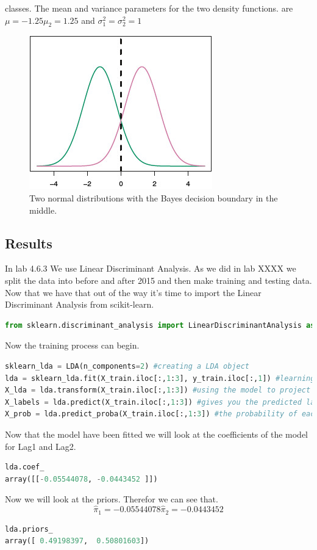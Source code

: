 classes. The mean and variance parameters for the two density functions. 
are $\mu=-1.25 \mu_2=1.25$ and $\sigma^2_1=\sigma^2_2=1$
\begin{figure}[h]
	\centering
	\includegraphics[scale=1.0]{discriminantAnalysis/linearDiscriminantAnalysis/fig/TwoOneDimensionalNormalDensityFunctions.jpg}
	\caption{Two normal distributions with the Bayes decision boundary in the middle.}
	\label{fig:TwoOneDimensionalNormalDensityFunctions}
\end{figure}



\subsection{Results}
In lab 4.6.3 We use Linear Discriminant Analysis. As we did in lab XXXX we split the data into before and after 2015 and then make training and testing data. Now that we have that out of the way it's time to import the Linear Discriminant Analysis from scikit-learn.
\begin{lstlisting}[language=Python]
from sklearn.discriminant_analysis import LinearDiscriminantAnalysis as LDA
\end{lstlisting}
Now the training process can begin.
\begin{lstlisting}[language=Python]
sklearn_lda = LDA(n_components=2) #creating a LDA object
lda = sklearn_lda.fit(X_train.iloc[:,1:3], y_train.iloc[:,1]) #learning the projection matrix
X_lda = lda.transform(X_train.iloc[:,1:3]) #using the model to project X. Project data to maximize class separation.
X_labels = lda.predict(X_train.iloc[:,1:3]) #gives you the predicted label for each sample
X_prob = lda.predict_proba(X_train.iloc[:,1:3]) #the probability of each sample to belong to each class
\end{lstlisting}
Now that the model have been fitted we will look at the coefficients of the model for Lag1 and Lag2.
\begin{lstlisting}[language=Python]
lda.coef_
array([[-0.05544078, -0.0443452 ]])
\end{lstlisting}
Now we will look at the priors. Therefor we can see that. $$ \hat{ \pi }_1 = -0.05544078  \hat{ \pi }_2 = -0.0443452 $$ 
\begin{lstlisting}[language=Python]
lda.priors_
array([ 0.49198397,  0.50801603])
\end{lstlisting}

